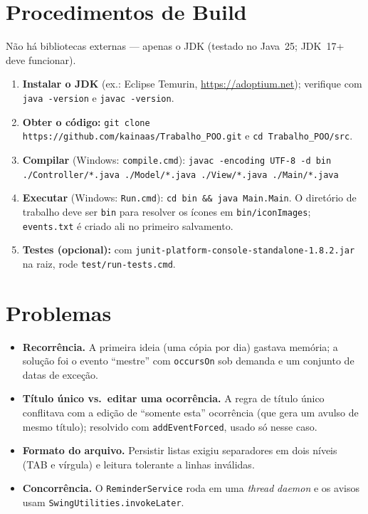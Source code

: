 \documentclass[10pt,a4paper]{article}
\begin{document}
\section{Procedimentos de Build}
Não há bibliotecas externas — apenas o JDK (testado no Java~25; JDK~17+ deve funcionar).
\begin{enumerate}
  \item \textbf{Instalar o JDK} (ex.: Eclipse Temurin, \url{https://adoptium.net});
        verifique com \texttt{java -version} e \texttt{javac -version}.
  \item \textbf{Obter o código:} \texttt{git clone https://github.com/kainaas/Trabalho\_POO.git}
        e \texttt{cd Trabalho\_POO/src}.
  \item \textbf{Compilar} (Windows: \texttt{compile.cmd}):
        \texttt{javac -encoding UTF-8 -d bin ./Controller/*.java ./Model/*.java ./View/*.java ./Main/*.java}
  \item \textbf{Executar} (Windows: \texttt{Run.cmd}): \texttt{cd bin \&\& java Main.Main}.
        O diretório de trabalho deve ser \texttt{bin} para resolver os ícones em
        \texttt{bin/iconImages}; \texttt{events.txt} é criado ali no primeiro salvamento.
  \item \textbf{Testes (opcional):} com \texttt{junit-platform-console-standalone-1.8.2.jar}
        na raiz, rode \texttt{test/run-tests.cmd}.
\end{enumerate}

\section{Problemas}
\begin{itemize}
  \item \textbf{Recorrência.} A primeira ideia (uma cópia por dia) gastava memória;
        a solução foi o evento ``mestre'' com \texttt{occursOn} sob demanda e um
        conjunto de datas de exceção.
  \item \textbf{Título único vs.\ editar uma ocorrência.} A regra de título único
        conflitava com a edição de ``somente esta'' ocorrência (que gera um avulso
        de mesmo título); resolvido com \texttt{addEventForced}, usado só nesse caso.
  \item \textbf{Formato do arquivo.} Persistir listas exigiu separadores em dois
        níveis (TAB e vírgula) e leitura tolerante a linhas inválidas.
  \item \textbf{Concorrência.} O \texttt{ReminderService} roda em uma \emph{thread}
        \emph{daemon} e os avisos usam \texttt{SwingUtilities.invokeLater}.
\end{itemize}
\end{document}
